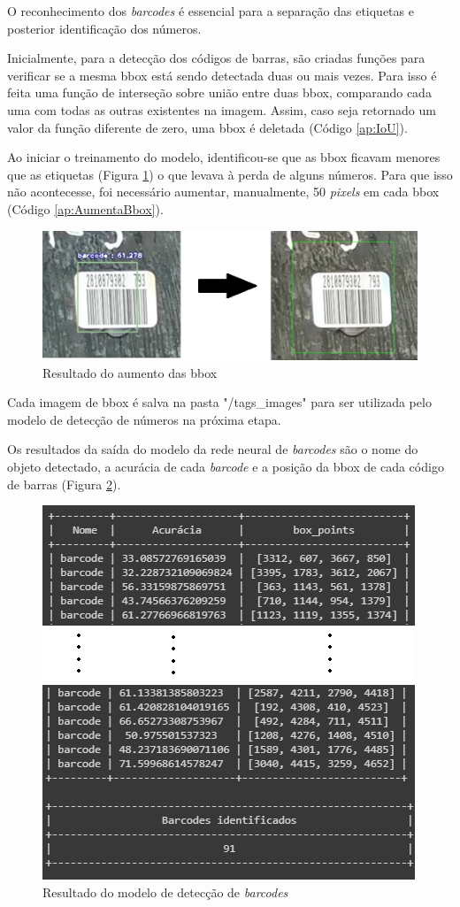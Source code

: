 O reconhecimento dos \textit{barcodes} é essencial para a separação das etiquetas e posterior identificação dos números.

Inicialmente, para a detecção dos códigos de barras, são criadas funções para verificar se a mesma bbox está sendo detectada duas ou mais vezes. Para isso é feita uma função de interseção sobre união entre duas bbox, comparando cada uma com todas as outras existentes na imagem. Assim, caso seja retornado um valor da função diferente de zero, uma bbox é deletada (Código \ref{ap:IoU}).

Ao iniciar o treinamento do modelo, identificou-se que as bbox ficavam menores que as etiquetas (Figura \ref{fig:bboxNew}) o que levava à perda de alguns números. Para que isso não acontecesse, foi necessário aumentar, manualmente, 50 \textit{pixels} em cada bbox (Código \ref{ap:AumentaBbox}).

\begin{figure}[H]
	\centering
	\includegraphics[width=1\linewidth]{figuras/MachineLearning/bboxNew.png}
	\caption{Resultado do aumento das bbox}
	\label{fig:bboxNew}
\end{figure}

Cada imagem de bbox é salva na pasta "/tags\_images" para ser utilizada pelo modelo de detecção de números na próxima etapa.

Os resultados da saída do modelo da rede neural de \textit{barcodes} são o nome do objeto detectado, a acurácia de cada \textit{barcode} e a posição da bbox de cada código de barras (Figura \ref{fig:indentBarcodes}).

\begin{figure}[H]
	\centering
	\includegraphics[width=0.6\linewidth]{figuras/MachineLearning/indentBarcodes.png}
	\caption{ Resultado do modelo de detecção de \textit{barcodes}}
	\label{fig:indentBarcodes}
\end{figure}


